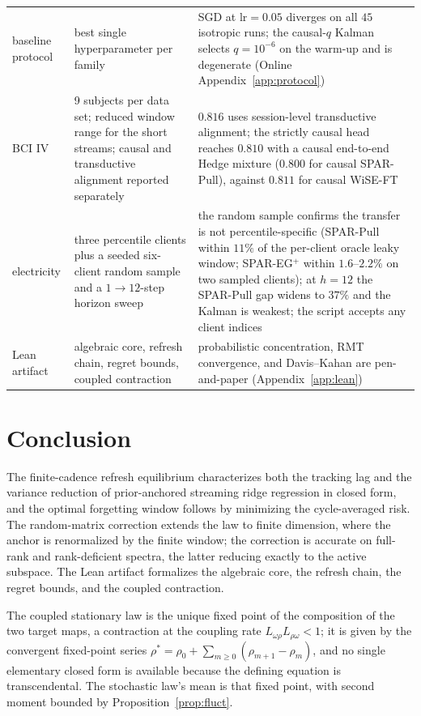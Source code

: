 \documentclass[twoside,11pt]{article}
\begin{document}
\begin{table}[t]
\begin{tabular}{p{1.08in}p{2.02in}p{2.5in}}
baseline protocol & best single hyperparameter per family & SGD at $\mathrm{lr}=0.05$ diverges on all $45$ isotropic runs; the causal-$q$ Kalman selects $q=10^{-6}$ on the warm-up and is degenerate (Online Appendix~\ref{app:protocol}) \\
BCI IV & 9 subjects per data set; reduced window range for the short streams; causal and transductive alignment reported separately & $0.816$ uses session-level transductive alignment; the strictly causal head reaches $0.810$ with a causal end-to-end Hedge mixture ($0.800$ for causal SPAR-Pull), against $0.811$ for causal WiSE-FT \\
electricity & three percentile clients plus a seeded six-client random sample and a $1\to12$-step horizon sweep & the random sample confirms the transfer is not percentile-specific (SPAR-Pull within $11\%$ of the per-client oracle leaky window; SPAR-EG$^+$ within $1.6$--$2.2\%$ on two sampled clients); at $h=12$ the SPAR-Pull gap widens to $37\%$ and the Kalman is weakest; the script accepts any client indices \\
Lean artifact & algebraic core, refresh chain, regret bounds, coupled contraction & probabilistic concentration, RMT convergence, and Davis--Kahan are pen-and-paper (Appendix~\ref{app:lean}) \\
\bottomrule
\end{tabular}
\end{table}

\section{Conclusion}
The finite-cadence refresh equilibrium characterizes both the tracking lag and the variance reduction of prior-anchored streaming ridge regression in closed form, and the optimal forgetting window follows by minimizing the cycle-averaged risk.
The random-matrix correction extends the law to finite dimension, where the anchor is renormalized by the finite window; the correction is accurate on full-rank and rank-deficient spectra, the latter reducing exactly to the active subspace.
The Lean artifact formalizes the algebraic core, the refresh chain, the regret bounds, and the coupled contraction.

The coupled stationary law is the unique fixed point of the composition of the two target maps, a contraction at the coupling rate $L_{\omega\rho}L_{\rho\omega}<1$; it is given by the convergent fixed-point series $\rho^*=\rho_0+\sum_{m\ge0}(\rho_{m+1}-\rho_m)$, and no single elementary closed form is available because the defining equation is transcendental.
The stochastic law's mean is that fixed point, with second moment bounded by Proposition~\ref{prop:fluct}.


\appendix



\end{document}
